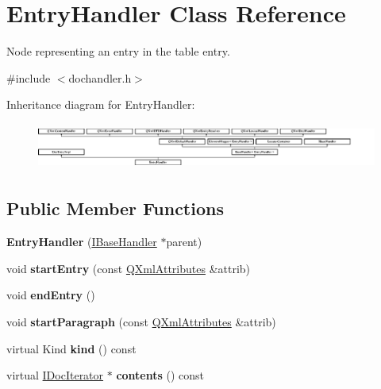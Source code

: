 \hypertarget{class_entry_handler}{}\section{Entry\+Handler Class Reference}
\label{class_entry_handler}


Node representing an entry in the table entry.  




{\ttfamily \#include $<$dochandler.\+h$>$}

Inheritance diagram for Entry\+Handler\+:\begin{figure}[H]
\begin{center}
\leavevmode
\includegraphics[height=1.545894cm]{class_entry_handler}
\end{center}
\end{figure}
\subsection*{Public Member Functions}
\begin{DoxyCompactItemize}
\item 
\mbox{\label{class_entry_handler_a41c4849c06cfd1fcbe2b8a2a3a3a696d}} 
{\bfseries Entry\+Handler} (\mbox{\hyperlink{class_i_base_handler}{I\+Base\+Handler}} $\ast$parent)
\item 
\mbox{\label{class_entry_handler_ac0bbcdb201c9d3afafa0cd346c333b08}} 
void {\bfseries start\+Entry} (const \mbox{\hyperlink{class_q_xml_attributes}{Q\+Xml\+Attributes}} \&attrib)
\item 
\mbox{\label{class_entry_handler_ae4e7fb47298a901beb6435aefecd10e2}} 
void {\bfseries end\+Entry} ()
\item 
\mbox{\label{class_entry_handler_abdddf2afd859afbd15aaeb33587de58c}} 
void {\bfseries start\+Paragraph} (const \mbox{\hyperlink{class_q_xml_attributes}{Q\+Xml\+Attributes}} \&attrib)
\item 
\mbox{\label{class_entry_handler_ad10740267ccd1a18c378e447bb6f297e}} 
virtual Kind {\bfseries kind} () const
\item 
\mbox{\label{class_entry_handler_a93de5cfcea45cbef3be35c09c9941985}} 
virtual \mbox{\hyperlink{class_i_doc_iterator}{I\+Doc\+Iterator}} $\ast$ {\bfseries contents} () const
\end{DoxyCompactItemize}

